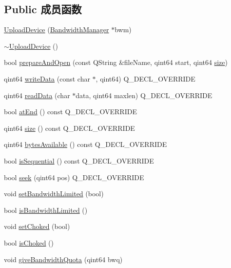 \subsection*{Public 成员函数}
\begin{DoxyCompactItemize}
\item 
\hyperlink{class_o_c_c_1_1_upload_device_adcb30f5e9e2572dae1a5b8fb33f18b6b}{Upload\+Device} (\hyperlink{class_o_c_c_1_1_bandwidth_manager}{Bandwidth\+Manager} $\ast$bwm)
\item 
\hyperlink{class_o_c_c_1_1_upload_device_a28fdfc6160d2f096fb657742368b0054}{$\sim$\+Upload\+Device} ()
\item 
bool \hyperlink{class_o_c_c_1_1_upload_device_ab5020fa1b5d32d7e4b80573adb21db72}{prepare\+And\+Open} (const Q\+String \&file\+Name, qint64 start, qint64 \hyperlink{class_o_c_c_1_1_upload_device_a57a932984aa5882d829251720a8445e0}{size})
\item 
qint64 \hyperlink{class_o_c_c_1_1_upload_device_a23b5299ca1b3774ec634d2367f9961bb}{write\+Data} (const char $\ast$, qint64) Q\+\_\+\+D\+E\+C\+L\+\_\+\+O\+V\+E\+R\+R\+I\+DE
\item 
qint64 \hyperlink{class_o_c_c_1_1_upload_device_a9dd03b989cf05cfe03c9c56c5cc1213d}{read\+Data} (char $\ast$data, qint64 maxlen) Q\+\_\+\+D\+E\+C\+L\+\_\+\+O\+V\+E\+R\+R\+I\+DE
\item 
bool \hyperlink{class_o_c_c_1_1_upload_device_aeac798906622f0fb1dcb821d161f2abc}{at\+End} () const Q\+\_\+\+D\+E\+C\+L\+\_\+\+O\+V\+E\+R\+R\+I\+DE
\item 
qint64 \hyperlink{class_o_c_c_1_1_upload_device_a57a932984aa5882d829251720a8445e0}{size} () const Q\+\_\+\+D\+E\+C\+L\+\_\+\+O\+V\+E\+R\+R\+I\+DE
\item 
qint64 \hyperlink{class_o_c_c_1_1_upload_device_a3deba7611e8133aac3d03d61ad4eae2c}{bytes\+Available} () const Q\+\_\+\+D\+E\+C\+L\+\_\+\+O\+V\+E\+R\+R\+I\+DE
\item 
bool \hyperlink{class_o_c_c_1_1_upload_device_a2f4f0ad62142f46ed15e9966adb7ca35}{is\+Sequential} () const Q\+\_\+\+D\+E\+C\+L\+\_\+\+O\+V\+E\+R\+R\+I\+DE
\item 
bool \hyperlink{class_o_c_c_1_1_upload_device_a966ab3a0165321a5ebd04db0cb300c72}{seek} (qint64 pos) Q\+\_\+\+D\+E\+C\+L\+\_\+\+O\+V\+E\+R\+R\+I\+DE
\item 
void \hyperlink{class_o_c_c_1_1_upload_device_a3a401fc06327e59d5e49baf517035f45}{set\+Bandwidth\+Limited} (bool)
\item 
bool \hyperlink{class_o_c_c_1_1_upload_device_a7edc37d150e57de929f2a8d19a041d56}{is\+Bandwidth\+Limited} ()
\item 
void \hyperlink{class_o_c_c_1_1_upload_device_a80e877e6572384b2eaf17ffa5016e059}{set\+Choked} (bool)
\item 
bool \hyperlink{class_o_c_c_1_1_upload_device_a26dc26a22ec7ca5d7dc3a9e0f14808a8}{is\+Choked} ()
\item 
void \hyperlink{class_o_c_c_1_1_upload_device_a9025767357fbea7bcae2d3543b95c17a}{give\+Bandwidth\+Quota} (qint64 bwq)
\end{DoxyCompactItemize}
